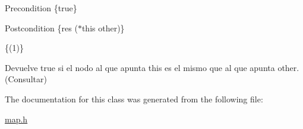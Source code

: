 \begin{DoxyPrecond}{\-Precondition}
\{true\} 
\end{DoxyPrecond}
\begin{DoxyPostcond}{\-Postcondition}
\{res  ($\ast$this  other)\}
\end{DoxyPostcond}
\{(1)\}

\-Devuelve true si el nodo al que apunta this es el mismo que al que apunta other. (\-Consultar) 

\-The documentation for this class was generated from the following file\-:\begin{DoxyCompactItemize}
\item 
\hyperlink{map_8h}{map.\-h}\end{DoxyCompactItemize}
